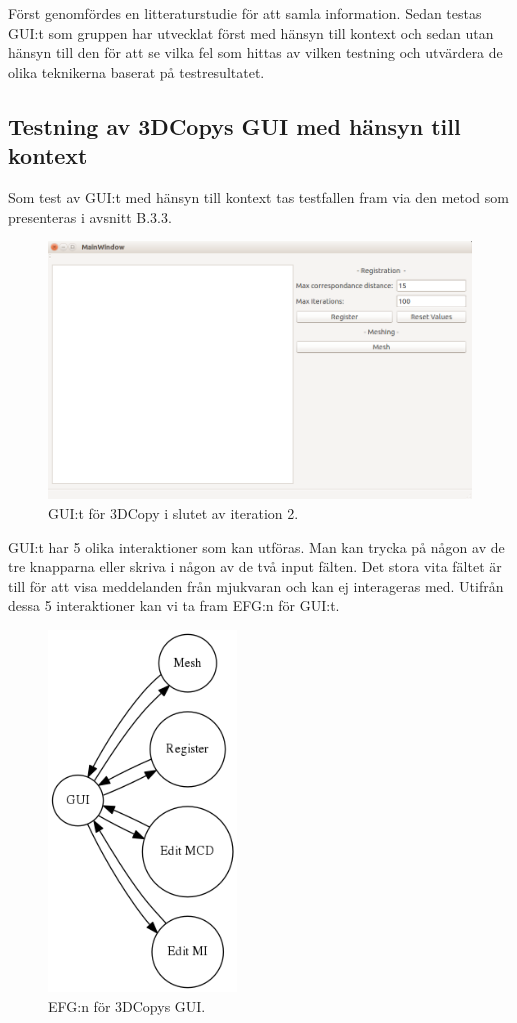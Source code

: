 Först genomfördes en litteraturstudie för att samla information. Sedan testas GUI:t som gruppen har utvecklat först med hänsyn till kontext och sedan utan hänsyn till den för att se vilka fel som hittas av vilken testning och utvärdera de olika teknikerna baserat på testresultatet.

\subsection{Testning av 3DCopys GUI med hänsyn till kontext}

Som test av GUI:t med hänsyn till kontext tas testfallen fram via den metod som presenteras i avsnitt B.3.3.

\begin{figure}[H]
	\centering
	\includegraphics[width=130mm]{figures/3DCopyGUI.png}
	\caption{GUI:t för 3DCopy i slutet av iteration 2.}
	\label{fig:3dcopy_gui}
\end{figure}

GUI:t har 5 olika interaktioner som kan utföras. Man kan trycka på någon av de tre knapparna eller skriva i någon av de två input fälten. Det stora vita fältet är till för att visa meddelanden från mjukvaran och kan ej interageras med. Utifrån dessa 5 interaktioner kan vi ta fram EFG:n för GUI:t.

\begin{figure}[H]
	\centering
	\includegraphics[width=50mm]{figures/3DCopyGUIEFG.png}
	\caption{EFG:n för 3DCopys GUI.}
	\label{fig:3dcopy_guiefg}
\end{figure}

